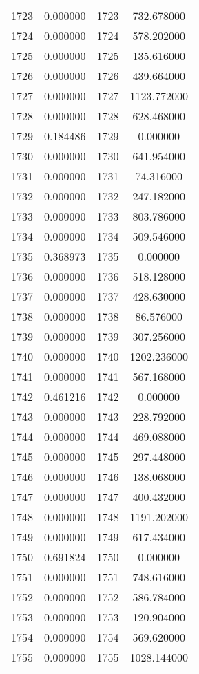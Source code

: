 \documentclass[12pt]{article}
\begin{document}
\begin{longtable}{@{}cccc@{}}
1723 & 0.000000 & 1723 & 732.678000 \\
1724 & 0.000000 & 1724 & 578.202000 \\
1725 & 0.000000 & 1725 & 135.616000 \\
1726 & 0.000000 & 1726 & 439.664000 \\
1727 & 0.000000 & 1727 & 1123.772000 \\
1728 & 0.000000 & 1728 & 628.468000 \\
1729 & 0.184486 & 1729 & 0.000000 \\
1730 & 0.000000 & 1730 & 641.954000 \\
1731 & 0.000000 & 1731 & 74.316000 \\
1732 & 0.000000 & 1732 & 247.182000 \\
1733 & 0.000000 & 1733 & 803.786000 \\
1734 & 0.000000 & 1734 & 509.546000 \\
1735 & 0.368973 & 1735 & 0.000000 \\
1736 & 0.000000 & 1736 & 518.128000 \\
1737 & 0.000000 & 1737 & 428.630000 \\
1738 & 0.000000 & 1738 & 86.576000 \\
1739 & 0.000000 & 1739 & 307.256000 \\
1740 & 0.000000 & 1740 & 1202.236000 \\
1741 & 0.000000 & 1741 & 567.168000 \\
1742 & 0.461216 & 1742 & 0.000000 \\
1743 & 0.000000 & 1743 & 228.792000 \\
1744 & 0.000000 & 1744 & 469.088000 \\
1745 & 0.000000 & 1745 & 297.448000 \\
1746 & 0.000000 & 1746 & 138.068000 \\
1747 & 0.000000 & 1747 & 400.432000 \\
1748 & 0.000000 & 1748 & 1191.202000 \\
1749 & 0.000000 & 1749 & 617.434000 \\
1750 & 0.691824 & 1750 & 0.000000 \\
1751 & 0.000000 & 1751 & 748.616000 \\
1752 & 0.000000 & 1752 & 586.784000 \\
1753 & 0.000000 & 1753 & 120.904000 \\
1754 & 0.000000 & 1754 & 569.620000 \\
1755 & 0.000000 & 1755 & 1028.144000 \\

\end{longtable}
\end{document}

